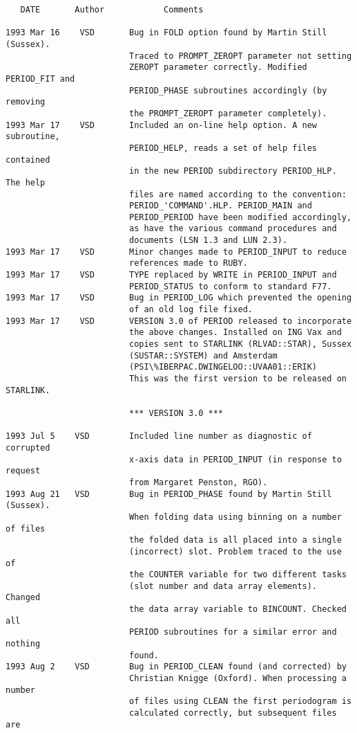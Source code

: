 \newpage


\begin{verbatim}
   DATE       Author            Comments

1993 Mar 16    VSD       Bug in FOLD option found by Martin Still (Sussex).
                         Traced to PROMPT_ZEROPT parameter not setting
                         ZEROPT parameter correctly. Modified PERIOD_FIT and
                         PERIOD_PHASE subroutines accordingly (by removing
                         the PROMPT_ZEROPT parameter completely).
1993 Mar 17    VSD       Included an on-line help option. A new subroutine,
                         PERIOD_HELP, reads a set of help files contained
                         in the new PERIOD subdirectory PERIOD_HLP. The help
                         files are named according to the convention:
                         PERIOD_'COMMAND'.HLP. PERIOD_MAIN and
                         PERIOD_PERIOD have been modified accordingly,
                         as have the various command procedures and
                         documents (LSN 1.3 and LUN 2.3).
1993 Mar 17    VSD       Minor changes made to PERIOD_INPUT to reduce
                         references made to RUBY.
1993 Mar 17    VSD       TYPE replaced by WRITE in PERIOD_INPUT and
                         PERIOD_STATUS to conform to standard F77.
1993 Mar 17    VSD       Bug in PERIOD_LOG which prevented the opening
                         of an old log file fixed.
1993 Mar 17    VSD       VERSION 3.0 of PERIOD released to incorporate
                         the above changes. Installed on ING Vax and
                         copies sent to STARLINK (RLVAD::STAR), Sussex
                         (SUSTAR::SYSTEM) and Amsterdam
                         (PSI\%IBERPAC.DWINGELOO::UVAA01::ERIK)
                         This was the first version to be released on STARLINK.

                         *** VERSION 3.0 ***

1993 Jul 5    VSD        Included line number as diagnostic of corrupted
                         x-axis data in PERIOD_INPUT (in response to request
                         from Margaret Penston, RGO).
1993 Aug 21   VSD        Bug in PERIOD_PHASE found by Martin Still (Sussex).
                         When folding data using binning on a number of files
                         the folded data is all placed into a single
                         (incorrect) slot. Problem traced to the use of
                         the COUNTER variable for two different tasks
                         (slot number and data array elements). Changed
                         the data array variable to BINCOUNT. Checked all
                         PERIOD subroutines for a similar error and nothing
                         found.
1993 Aug 2    VSD        Bug in PERIOD_CLEAN found (and corrected) by
                         Christian Knigge (Oxford). When processing a number
                         of files using CLEAN the first periodogram is
                         calculated correctly, but subsequent files are

\end{verbatim}


